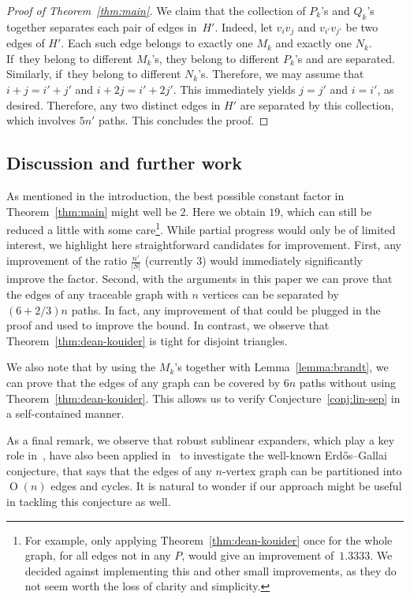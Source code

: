\documentclass{aic}
\DeclareMathOperator{\bigoh}{\mathrm{O}}
\begin{document}
\begin{proof}[Proof of Theorem~\ref{thm:main}]
We claim that the collection of $P_k$'s and $Q_k$'s
together separates each pair of edges in~\(H'\).
Indeed, let $v_iv_j$ and $v_{i'}v_{j'}$ be two edges of \(H'\).
Each such edge belongs to exactly one $M_k$ and exactly one $N_k$.
If~they belong to different \(M_k\)'s, they belong to different $P_k$'s and are separated.
Similarly, if~they belong to different $N_k$'s. Therefore, we may assume that $i+j=i'+j'$ and $i+2 j=i'+2 j'$. This immediately yields $j=j'$ and $i=i'$,
as desired. Therefore, any two distinct edges in $H'$ are separated by this collection, which involves $5n'$ paths.
This concludes the proof.
\end{proof}

\subsection*{Discussion and further work}
As mentioned in the introduction, the best possible constant factor in Theorem~\ref{thm:main} might well be $2$. Here we obtain $19$, which can still be reduced a little with some care\footnote{For example, only applying Theorem~\ref{thm:dean-kouider} once for the whole graph, for all edges not in any $P$, would give an improvement of~$1.3333$. We decided against implementing this and other small improvements, as they do not seem worth the loss of clarity and simplicity.
}. While partial progress would only be of limited interest, we highlight here straightforward candidates for improvement. First, any improvement of the ratio $\frac{n'}{|S|}$ (currently $3$) would immediately significantly improve the factor. Second, with the arguments in this paper we can prove that the edges of any traceable graph with \(n\) vertices can be separated by \((6+2/3)n\) paths. In fact, any improvement of that could be plugged in the proof and used to improve the bound.
In contrast, we observe that Theorem~\ref{thm:dean-kouider} is tight for disjoint triangles.


We also note that by using the \(M_k\)'s together with Lemma~\ref{lemma:brandt}, we can prove that the edges of any graph can be covered by \(6n\) paths without using Theorem~\ref{thm:dean-kouider}. This allows us to verify Conjecture~\ref{conj:lin-sep}
in a self-contained manner.

  As a final remark, we observe that robust sublinear expanders,
which play a key role in~\cite{letzter2022separating}, have also
been applied in~\cite{bucic2022towards} to investigate the well-known Erd\H os--Gallai
conjecture, that says that the edges of any $n$-vertex graph can
be partitioned into $\bigoh(n) $ edges and
cycles. It is natural to wonder if our
approach might be useful in tackling this conjecture as well.
\end{document}

